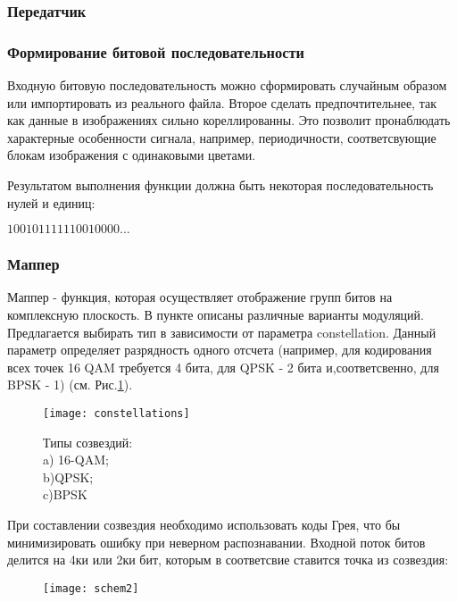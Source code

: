 \documentclass[a4paper,12pt]{article}
\begin{document}
\subsubsection{Передатчик}
\subsubsection*{Формирование битовой последовательности}

Входную битовую последовательность можно сформировать случайным образом или импортировать из реального файла.
Второе сделать предпочтительнее, так как данные в изображениях сильно кореллированны. Это позволит пронаблюдать характерные особенности сигнала, например, периодичности,  соответсвующие блокам изображения с одинаковыми цветами.  %

Результатом выполнения функции должна быть некоторая последовательность нулей и единиц:

$ 100101111110010000 ...$





\subsubsection*{Маппер}
Маппер - функция, которая осуществляет отображение групп битов на комплексную плоскость. 
В пункте %
описаны различные варианты модуляций. 
Предлагается выбирать тип в зависимости от параметра constellation.
Данный параметр определяет разрядность одного отсчета (например, для кодирования всех точек 16 QAM требуется 4 бита, для QPSK  - 2 бита и,соответсвенно, для BPSK - 1) (см. Рис.\ref{fg:constellations}).

\begin{figure}[H]
\centering
\texttt{[image: constellations]}
\caption{Типы созвездий:\\ a) 16-QAM;\\b)QPSK;\\c)BPSK} \label{fg:constellations}
\end{figure}

При составлении созвездия необходимо использовать коды Грея, что бы минимизировать ошибку при неверном распознавании. %
Входной поток битов делится на 4ки или 2ки бит, которым в соответсвие ставится точка из созвездия:

\begin{figure}[H]
\centering
\texttt{[image: schem2]}
\end{figure}
 
\end{document}
